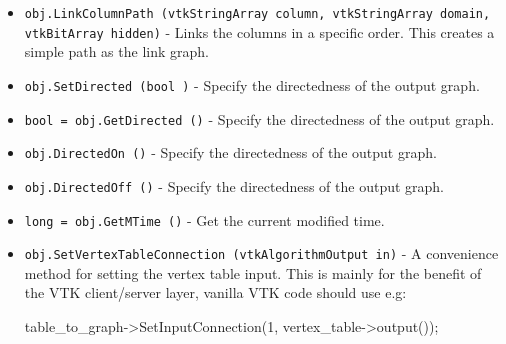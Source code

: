 \begin{itemize}
\item  \verb|obj.LinkColumnPath (vtkStringArray column, vtkStringArray domain, vtkBitArray hidden)| -  Links the columns in a specific order.
 This creates a simple path as the link graph.

\item  \verb|obj.SetDirected (bool )| -  Specify the directedness of the output graph.

\item  \verb|bool = obj.GetDirected ()| -  Specify the directedness of the output graph.

\item  \verb|obj.DirectedOn ()| -  Specify the directedness of the output graph.

\item  \verb|obj.DirectedOff ()| -  Specify the directedness of the output graph.

\item  \verb|long = obj.GetMTime ()| -  Get the current modified time.

\item  \verb|obj.SetVertexTableConnection (vtkAlgorithmOutput in)| -  A convenience method for setting the vertex table input.  This
 is mainly for the benefit of the VTK client/server layer,
 vanilla VTK code should use e.g:

 table\_to\_graph->SetInputConnection(1, vertex\_table->output());


\end{itemize}
